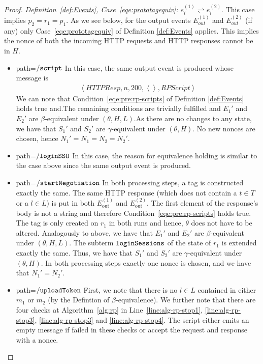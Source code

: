 \begin{proof}
    \noindent \emph{Definition~\ref{def:Events}, Case~\ref{eqe:prototagequiv}:}
    $e_i^{(1)}\rightleftharpoons e_i^{(2)}$. This case implies 
    $p_2=r_1=p_1$. As we see below, for the output events 
    $E_{out}^{(1)}$ and $E_{out}^{(2)}$ (if any) only 
    Case~\ref{eqe:prototagequiv} of Definition \ref{def:Events} 
    applies. This implies the nonce of both the incoming HTTP 
    requests and HTTP responses cannot be in $H$.
    \begin{itemize}
      \item path=$\mathtt{/script}$ 
        In this case, the same output 
        event is produced whose message is 
        \begin{equation}
          \begin{aligned}
            \left\langle HTTPResp,n,200,\left\langle\right\rangle,RPScript\right\rangle
          \end{aligned}
        \end{equation}
        We can note that Condition~\ref{eqe:pre:rp-scripts} of 
        Definition \ref{def:Events} 
        holds true and.The remaining conditions are trivially 
        fulfilled and $E_1\prime$ and $E_2\prime$ are 
        $\beta$-equivalent under $(\theta,H,L)$.As there are no 
        changes to any state, we have that $S_1\prime$ and 
        $S_2\prime$ are $\gamma$-equivalent under $(\theta,H)$. 
        No new nonces are chosen, hence $N_1\prime=N_1=N_2=N_2\prime$.
      \item path=$\mathtt{/loginSSO}$ 
        In this case, the reason for equivalence holding is 
        similar to the case above since the same output event 
        is produced.
      \item path=$\mathtt{/startNegotiation}$ 
        In both processing steps, a tag is constructed exactly 
        the same. The same HTTP response (which does not contain 
        a $t \in T$ or a $l \in L$) is put in both 
        $E^{(1)}_\text{out}$ and $E^{(2)}_\text{out}$. The first 
        element of the response's body is not a string and 
        therefore Condition~\ref{eqe:pre:rp-scripts} holds true. 
        The tag is only created on $r_1$ in both runs and hence, 
        $\theta$ does not have to be altered. 
        Analogously to above, we have that $E_1'$ and $E_2'$ are 
        $\beta$-equivalent under $(\theta,H,L)$. The subterm 
        $\mathtt{loginSessions}$ of the state of $r_1$ is extended 
        exactly the same. Thus, we have that $S_1'$ and $S_2'$ 
        are $\gamma$-equivalent under $(\theta,H)$. In both
        processing steps exactly one nonce is chosen, and we 
        have that $N_1' = N_2'$.
      \item path=$\mathtt{/uploadToken}$ 
        First, we note that there is no $l \in L$ contained in 
        either $m_1$ or $m_2$ (by the Defintion of 
        $\beta$-equivalence). We further note that there are 
        four checks at Algorithm~\ref{alg:rp} in
        Line~\ref{line:alg-rp-stop1}, \ref{line:alg-rp-stop3}, 
        \ref{line:alg-rp-stop3} and \ref{line:alg-rp-stop4}.
        The script either emits an empty message if failed in
        these checks or accept the request and response with a 
        nonce.
  

\end{itemize}
\end{proof}

